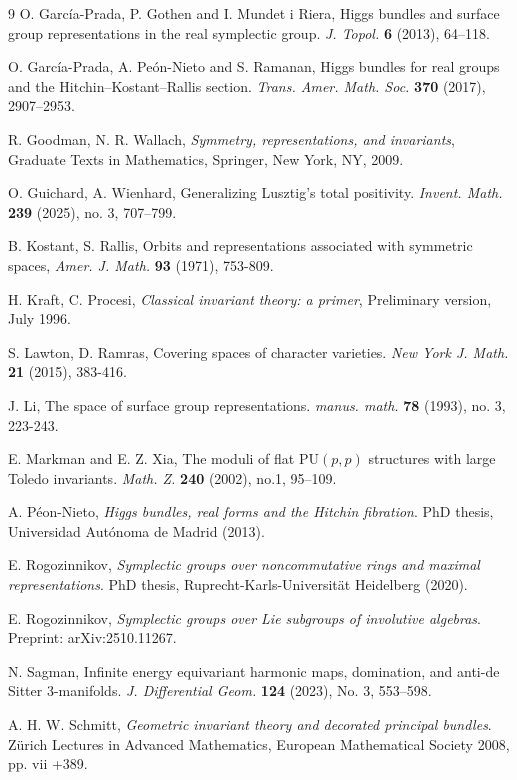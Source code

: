 \documentclass[oneside,11pt]{amsart}
\theoremstyle{definition}
\theoremstyle{remark}
\numberwithin{thm}{section}
\numberwithin{equation}{section}
\begin{document}
\begin{thebibliography}{9}
O. Garc\'ia-Prada, P. Gothen and I. Mundet i Riera, Higgs bundles and surface group representations in the real symplectic group. \emph{J. Topol.} \textbf{6} (2013), 64--118. 

O. Garc\'ia-Prada, A. Pe\'on-Nieto and S. Ramanan, Higgs bundles for real groups and the Hitchin--Kostant--Rallis section. \emph{Trans. Amer. Math. Soc.} \textbf{370} (2017), 2907--2953.

R. Goodman, N. R. Wallach, \emph{Symmetry, representations, and invariants}, Graduate Texts in Mathematics, Springer, New York, NY, 2009.

O. Guichard, A. Wienhard, Generalizing Lusztig's total positivity. \emph{Invent. Math.} \textbf{239} (2025), no. 3, 707--799. 

B. Kostant, S. Rallis, Orbits and representations associated with symmetric spaces, \emph{Amer. J. Math.} \textbf{93} (1971), 753-809.

H. Kraft, C. Procesi, \emph{Classical invariant theory: a primer}, Preliminary version, July 1996.

S. Lawton, D. Ramras, Covering spaces of character varieties. \emph{New York J. Math.} \textbf{21} (2015), 383-416.

J. Li, The space of surface group representations. \emph{manus. math.} \textbf{78} (1993), no. 3, 223-243.


E. Markman and E. Z. Xia, The moduli of flat $\mathrm{PU}(p, p)$ structures with large Toledo invariants. \emph{Math. Z.} \textbf{240} (2002), no.1, 95--109.


A. P\'{e}on-Nieto, \emph{Higgs bundles, real forms and the Hitchin fibration}. PhD thesis, Universidad Aut\'{o}noma de Madrid (2013).

E. Rogozinnikov, \emph{Symplectic groups over noncommutative rings and maximal representations}. PhD thesis,
Ruprecht-Karls-Universit\"{a}t Heidelberg (2020).

E. Rogozinnikov, \emph{Symplectic groups over Lie subgroups of involutive algebras}. Preprint: arXiv:2510.11267.

N. Sagman, Infinite energy equivariant harmonic maps, domination, and anti-de Sitter 3-manifolds. \emph{J. Differential Geom.} \textbf{124} (2023), No. 3, 553--598. 



A. H. W. Schmitt, \emph{Geometric invariant theory and decorated principal bundles}. Z\"{u}rich Lectures in Advanced Mathematics, European Mathematical Society 2008, pp. vii +389. 


\end{thebibliography}
\end{document}
